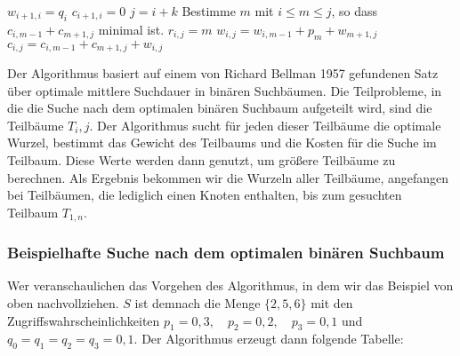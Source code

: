 \begin{Alg}
\begin{algorithmic}[1]
      \State $w_{i+1,i} = q_i$
      \State $c_{i+1,i} = 0$
    \EndFor
        \State $j=i+k$
        \State Bestimme $m$ mit $i \le m \le j$, so dass $c_{i,m-1} + c_{m+1,j}$ minimal ist.
        \State $r_{i,j} = m$
        \State $w_{i,j} = w_{i,m-1} + p_m + w_{m+1, j}$
        \State $c_{i,j} = c_{i, m-1} + c_{m+1, j} + w_{i, j}$
      \EndFor
    \EndFor
  \EndFunction
\end{algorithmic}
\end{Alg}


Der Algorithmus basiert auf einem von Richard Bellman 1957 gefundenen Satz über optimale mittlere Suchdauer in binären Suchbäumen. Die Teilprobleme, in die die Suche nach dem optimalen binären Suchbaum aufgeteilt wird, sind die Teilbäume $T_i,j$. Der Algorithmus sucht für jeden dieser Teilbäume die optimale Wurzel, bestimmt das Gewicht des Teilbaums und die Kosten für die Suche im Teilbaum. Diese Werte werden dann genutzt, um größere Teilbäume zu berechnen. Als Ergebnis bekommen wir die Wurzeln aller Teilbäume, angefangen bei Teilbäumen, die lediglich einen Knoten enthalten, bis zum gesuchten Teilbaum $T_{1,n}$.

\subsubsection{Beispielhafte Suche nach dem optimalen binären Suchbaum}
Wer veranschaulichen das Vorgehen des Algorithmus, in dem wir das Beispiel von oben nachvollziehen. $S$ ist demnach die Menge $\{2, 5, 6\}$ mit den Zugriffswahrscheinlichkeiten $p_1 = 0{,}3,\quad p_2 = 0{,}2,\quad p_3 = 0{,} 1$ und $q_0 = q_1 = q_2 = q_3 = 0{,}1$. Der Algorithmus erzeugt dann folgende Tabelle:

